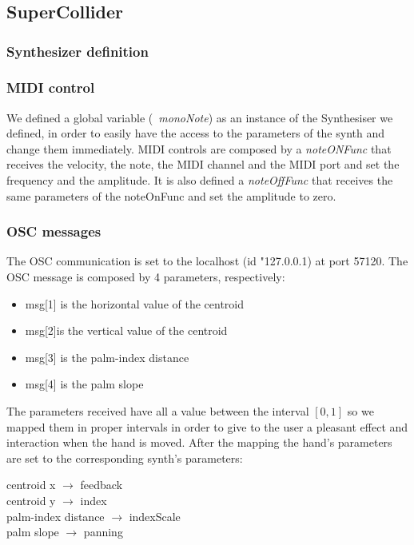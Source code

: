 \documentclass[a4paper,12pt]{report}
\begin{document}
\chapter{}
\section{SuperCollider}

\subsection*{Synthesizer definition}

\subsection*{MIDI control} 
We defined a global variable (\emph{~monoNote}) as an instance of the Synthesiser we defined, in order to easily have the access to the parameters of the synth and change them immediately.
MIDI controls are composed by a \emph{noteONFunc} that receives the velocity, the note, the MIDI channel and the MIDI port and set the frequency and the amplitude. It is also defined a \emph{noteOffFunc} that receives the same parameters of the noteOnFunc and set the amplitude to zero.

\subsection*{OSC messages}
The OSC communication is set to the localhost (id "127.0.0.1) at port 57120. The OSC message is composed by 4 parameters, respectively: 
\begin{itemize}
	\item msg[1] is the horizontal value of the centroid
	\item msg[2]is the vertical value of the centroid
	\item msg[3] is the palm-index distance
	\item msg[4] is the palm slope
\end{itemize}
The parameters received have all a value between the interval $[0,1]$ so we mapped them in proper intervals in order to give to the user a pleasant effect and interaction when the hand is moved. After the mapping the hand's parameters are set to the corresponding synth's parameters:
\begin{center}
centroid x $\rightarrow$ feedback\\
centroid y $\rightarrow$ index\\
palm-index distance $\rightarrow$ indexScale\\
palm slope $\rightarrow$ panning\\
\end{center}
\end{document}
